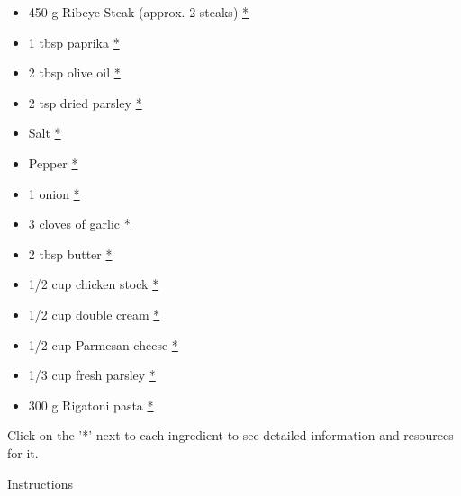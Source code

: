 \documentclass[
]{book}
\providecommand{\tightlist}{%
  \setlength{\itemsep}{0pt}\setlength{\parskip}{0pt}}
\begin{document}
\begin{itemize}
\tightlist
\item
  450 g Ribeye Steak (approx. 2 steaks)
  \href{https://www.publix.com/pd/ribeye-steaks-boneless-thin-sliced-publix-usda-choice-beef/RIO-PCI-119976?origin=search3}{*}
\item
  1 tbsp paprika
  \href{https://www.publix.com/pd/publix-paprika-ground/RIO-PCI-123196?origin=search1}{*}
\item
  2 tbsp olive oil
  \href{https://www.publix.com/pd/publix-olive-oil-extra-virgin/RIO-PCI-103897?origin=search1}{*}
\item
  2 tsp dried parsley
  \href{https://www.publix.com/pd/publix-parsley-flakes/RIO-PCI-111166?origin=search1}{*}
\item
  Salt
  \href{https://www.publix.com/pd/morton-salt/RIO-PCI-103677?origin=search9}{*}
\item
  Pepper
  \href{https://www.publix.com/pd/publix-black-pepper-ground/RIO-PCI-110488?origin=search1}{*}
\item
  1 onion
  \href{https://www.publix.com/pd/white-onions-jumbo/RIO-PCI-107142?origin=search3}{*}
\item
  3 cloves of garlic
  \href{https://www.publix.com/pd/garlic/RIO-PCI-107127?origin=search1}{*}
\item
  2 tbsp butter
  \href{https://www.publix.com/pd/land-o-lakes-salted-butter-sticks/RIO-PCI-112640?origin=search2}{*}
\item
  1/2 cup chicken stock
  \href{https://www.publix.com/pd/swanson-unsalted-chicken-stock/RIO-PCI-134444?origin=search1}{*}
\item
  1/2 cup double cream
  \href{https://www.publix.com/pd/devon-cream-double-cream-english/RIO-PCI-114706?origin=search1}{*}
\item
  1/2 cup Parmesan cheese
  \href{https://www.publix.com/pd/publix-parmesan-fancy-shredded-cheese/RIO-PCI-132616?origin=search6}{*}
\item
  1/3 cup fresh parsley
  \href{https://www.publix.com/pd/thats-tasty-italian-parsley/RIO-PCI-574065?origin=search4}{*}
\item
  300 g Rigatoni pasta
  \href{https://www.publix.com/pd/ronzoni-rigatoni-pasta-16-oz-large-ribbed-tubes-non-gmo/RIO-PCI-100730?origin=search4}{*}
\end{itemize}

Click on the '*' next to each ingredient to see detailed information and
resources for it.

Instructions
\end{document}
